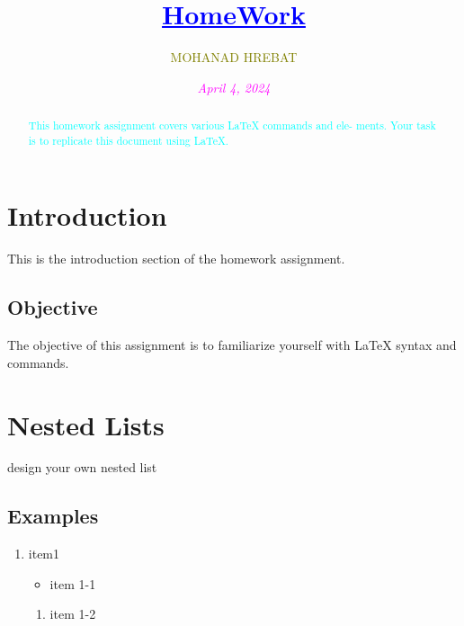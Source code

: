 \documentclass{article}
\title{\textcolor{blue}{\underline{HomeWork}} }
\author{\textcolor{olive}{\uppercase{mohanad hrebat}}}
\date{\textcolor{magenta}{\textit{April 4, 2024}}}
\begin{document}
\pagecolor{mohanad}
\fancyfoot[C]{\textcolor{magenta}{Page \thepage}}
\fancyhead[L]{\textcolor{blue}{Homework Assignment}}%
\maketitle

\begin{abstract}
  \textcolor{cyan}{This homework assignment covers various LaTeX commands and ele-
ments. Your task is to replicate this document using LaTeX.}  
\end{abstract}

\tableofcontents

\newpage

\section{\textcolor{lighblue}{Introduction}}

This is the introduction section of the homework assignment.

\subsection{Objective}
The objective of this assignment is to familiarize yourself with LaTeX syntax
and commands.

\section{Nested Lists}
design your own nested list

\subsection{Examples}
\begin{enumerate}
    \item item1
     \begin{itemize}
    \item item 1-1
    \end{itemize}
     \begin{enumerate}
        \item item 1-2
    \end{enumerate}
\end{enumerate}
\end{document}
